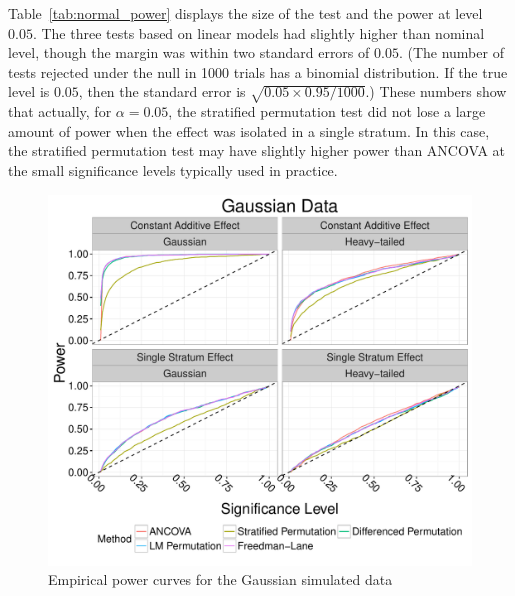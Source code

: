 \documentclass[12pt]{article}
\begin{document}
Table~\ref{tab:normal_power} displays the size of the test and the power at level $0.05$.
The three tests based on linear models had slightly higher than nominal level, though the margin was within two standard errors of $0.05$.
(The number of tests rejected under the null in 1000 trials has a binomial distribution.
If the true level is $0.05$, then the standard error is $\sqrt{0.05 \times 0.95/1000}$.)
These numbers show that actually, for $\alpha=0.05$, the stratified permutation test did not lose a large amount of power when the effect was isolated in a single stratum.
In this case, the stratified permutation test may have slightly higher power than ANCOVA at the small significance levels typically used in practice.
\begin{figure}[h]
\centering
\includegraphics[width = \textwidth]{fig/normal_simulation_power.pdf}
\caption{Empirical power curves for the Gaussian simulated data}
\label{fig:normal_sim_power}
\end{figure}
%
\end{document}
